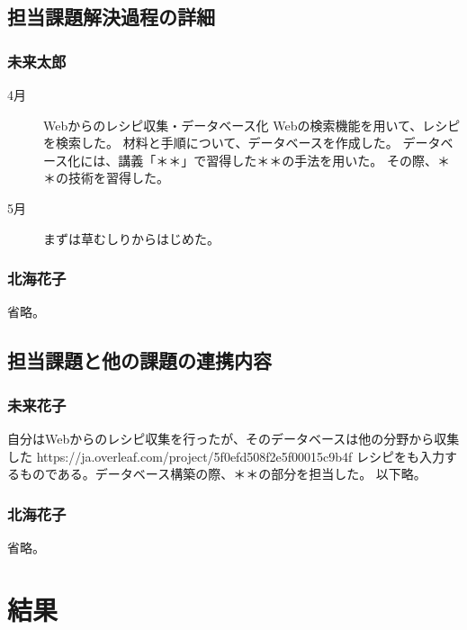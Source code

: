 \documentclass[openany,11pt,papersize]{jsbook}
\begin{document}

\section{担当課題解決過程の詳細}

\subsection{未来太郎}
\begin{description}
 \item[4月] Webからのレシピ収集・データベース化 
Webの検索機能を用いて、レシピを検索した。 
材料と手順について、データベースを作成した。 
データベース化には、講義「＊＊」で習得した＊＊の手法を用いた。 
その際、＊＊の技術を習得した。　　
 \item[5月]まずは草むしりからはじめた。
\end{description}



\subsection{北海花子}

省略。


\section{担当課題と他の課題の連携内容}

\subsection{未来花子}
自分はWebからのレシピ収集を行ったが、そのデータベースは他の分野から収集した https://ja.overleaf.com/project/5f0efd508f2e5f00015c9b4f
レシピをも入力するものである。データベース構築の際、＊＊の部分を担当した。
以下略。

\subsection{北海花子}
省略。



\chapter{結果}
\end{document}
